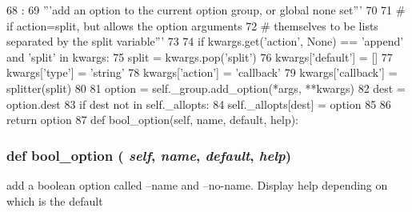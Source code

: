 \begin{DoxyCode}
68                                          :
69         '''add an option to the current option group, or global none set'''
70 
71         # if action=split, but allows the option arguments
72         # themselves to be lists separated by the split variable'''
73 
74         if kwargs.get('action', None) == 'append' and 'split' in kwargs:
75             split = kwargs.pop('split')
76             kwargs['default'] = []
77             kwargs['type'] = 'string'
78             kwargs['action'] = 'callback'
79             kwargs['callback'] = splitter(split)
80 
81         option = self._group.add_option(*args, **kwargs)
82         dest = option.dest
83         if dest not in self._allopts:
84             self._allopts[dest] = option
85 
86         return option
87 
    def bool_option(self, name, default, help):
\end{DoxyCode}
\hypertarget{classm5_1_1options_1_1OptionParser_aa2d1d05b008250ecf65db8a18be1c50b}{
\subsubsection[{bool\_\-option}]{\setlength{\rightskip}{0pt plus 5cm}def bool\_\-option ( {\em self}, \/   {\em name}, \/   {\em default}, \/   {\em help})}}
\label{classm5_1_1options_1_1OptionParser_aa2d1d05b008250ecf65db8a18be1c50b}
\begin{DoxyVerb}add a boolean option called --name and --no-name.
Display help depending on which is the default\end{DoxyVerb}
 



